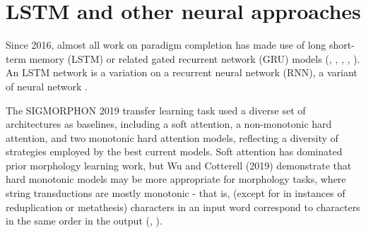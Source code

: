 \section{LSTM and other neural approaches}

Since 2016, almost all work on paradigm completion has made use of long short-term memory (LSTM) or related gated recurrent network (GRU) models (\cite{Faruqui2015}, \cite{Cotterell2016}, \cite{Cotterell2017a}, \cite{Cotterell2018b}, \cite{McCarthy2019}). An LSTM network is a variation on a recurrent neural network (RNN), a variant of neural network \parencite{Hochreiter1997}.

The SIGMORPHON 2019 transfer learning task used a diverse set of architectures as baselines, including a soft attention, a non-monotonic hard attention, and two monotonic hard attention models, reflecting a diversity of strategies employed by the best current models. Soft attention has dominated prior morphology learning work, but Wu and Cotterell (2019) demonstrate that hard monotonic models may be more appropriate for morphology tasks, where string transductions are mostly monotonic - that is, (except for in instances of reduplication or metathesis) characters in an input word correspond to characters in the same order in the output (\cite{McCarthy2019}, \cite{Wu2019}).
